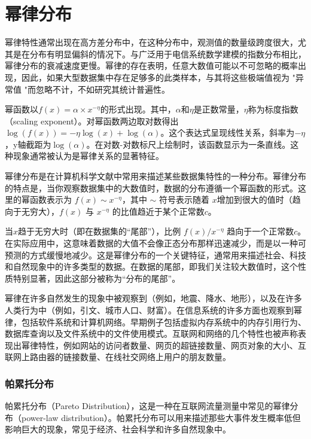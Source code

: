 \section*{幂律分布}

幂律特性通常出现在高方差分布中，在这种分布中，观测值的数量级跨度很大，尤其是在分布有明显偏斜的情况下。与广泛用于电信系统数学建模的指数分布相比，幂律分布的衰减速度更慢。幂律的存在表明，任意大数值可能以不可忽略的概率出现，因此，如果大型数据集中存在足够多的此类样本，与其将这些极端值视为 "异常值 "而忽略不计，不如研究其统计普遍性。

幂函数以$f(x)=\alpha \times x^{-\eta}$的形式出现。其中，$\alpha$和$\eta$是正数常量，$\eta$称为标度指数（scaling exponent）。对幂函数两边取对数得出 $\log (f(x)) = -\eta \log (x) + \log (\alpha)$。这个表达式呈现线性关系，斜率为$-\eta$，y轴截距为$\log (\alpha)$。在对数-对数标尺上绘制时，该函数显示为一条直线。这种现象通常被认为是幂律关系的显著特征。

幂律分布是在计算机科学文献中常用来描述某些数据集特性的一种分布。幂律分布的特点是，当你观察数据集中的大数值时，数据的分布遵循一个幂函数的形式。这里的幂函数表示为 $f(x)\sim  x^{−\eta}$，其中 $\sim$ 符号表示随着 $x$增加到很大的值时（趋向于无穷大），$f(x)$ 与 $x^{−\eta}$ 的比值趋近于某个正常数$c$。

当$ x $趋于无穷大时（即在数据集的``尾部''），比例 $f(x)/x^{−\eta}$ 趋向于一个正常数$c$。在实际应用中，这意味着数据的大值不会像正态分布那样迅速减少，而是以一种可预测的方式缓慢地减少。这是幂律分布的一个关键特征，通常用来描述社会、科技和自然现象中的许多类型的数据。在数据的尾部，即我们关注较大数值时，这个性质特别显著，因此这部分被称为“分布的尾部”。

幂律在许多自然发生的现象中被观察到（例如，地震、降水、地形），以及在许多人类行为中（例如，引文、城市人口、财富）。在信息系统的许多方面也观察到幂律，包括软件系统和计算机网络。早期例子包括虚拟内存系统中的内存引用行为、数据库查询以及文件系统中的文件使用模式。互联网和网络的几个特性也被声称表现出幂律特性，例如网站的访问者数量、网页的超链接数量、网页对象的大小、互联网上路由器的链接数量、在线社交网络上用户的朋友数量。

\subsubsection{帕累托分布}

帕累托分布（Pareto Distribution），这是一种在互联网流量测量中常见的幂律分布（power-law distribution）。帕累托分布可以用来描述那些大事件发生概率低但影响巨大的现象，常见于经济、社会科学和许多自然现象中。

